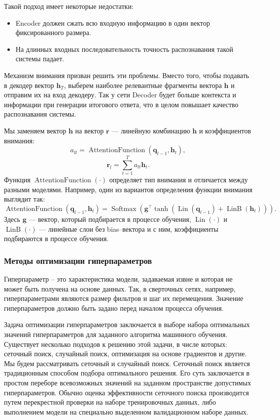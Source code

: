 Такой подход имеет некоторые недостатки:
\begin{itemize}
	\item Encoder должен сжать всю входную информацию в один вектор фиксированного размера.
	\item На длинных входных последовательность точность распознавания такой системы падает.
\end{itemize}

Механизм внимания призван решить эти проблемы. Вместо того, чтобы подавать в декодер вектор $\mathbf{h}_T$, выберем наиболее релевантные фрагменты вектора $\mathbf{h}$ и отправим их на вход декодеру. Так у сети Decoder будет больше контекста и информации при генерации итогового ответа, что в целом повышает качество распознавания системы.

Мы заменяем вектор $\mathbf{h}$ на вектор $\mathbf{r}$ --- линейную комбинацию $\mathbf{h}$ и коэффициентов внимания:
$$a_{lt} = \operatorname{AttentionFunction}(\mathbf{q}_{l - 1}, \mathbf{h}_t),$$
$$\mathbf{r}_l = \sum_{t = 1}^{T} a_{lt}\mathbf{h}_t.$$
Функция $\operatorname{AttentionFunction}(\cdot)$ определяет тип внимания и отличается между разными моделями. Например, один из вариантов определения функции внимания выглядит так:
$$\operatorname{AttentionFunction}(\mathbf{q}_{l - 1}, \mathbf{h}_t) = \operatorname{Softmax}(\mathbf{g}^\top \tanh(\operatorname{Lin}(\mathbf{q}_{l - 1}) + \operatorname{LinB}(\mathbf{h}_t))).$$
Здесь $\mathbf{g}$ --- вектор, который подбирается в процессе обучения, $\operatorname{Lin}(\cdot)$ и $\operatorname{LinB}(\cdot)$ --- линейные слои без bias--вектора и с ним, коэффициенты подбираются в процессе обучения.

\subsubsection{Методы оптимизации гиперпараметров}
Гиперпараметр -- это характеристика модели, задаваемая извне и которая не может быть получена на основе данных. Так, в сверточных сетях, например, гиперпараметрами являются размер фильтров и шаг их перемещения. Значение гиперпараметров должно быть задано перед началом процесса обучения.

Задача оптимизации гиперпараметров\cite{hyperparamopt-overview} заключается в выборе набора оптимальных значений гиперпараметров для заданного алгоритма машинного обучения. Существует несколько подходов к решению этой задачи, в числе которых: сеточный поиск, случайный поиск, оптимизация на основе градиентов и другие.
Мы будем рассматривать сеточный и случайный поиск. Сеточный поиск является традиционным способом подбора оптимального решения. Его суть заключается в простом переборе всевозможных значений на заданном пространстве допустимых гиперпараметров. Обычно оценка эффективности сеточного поиска производится путем перекрестной проверки на наборе тренировочных данных, либо выполнением модели на специально выделенном валидационном наборе данных.

